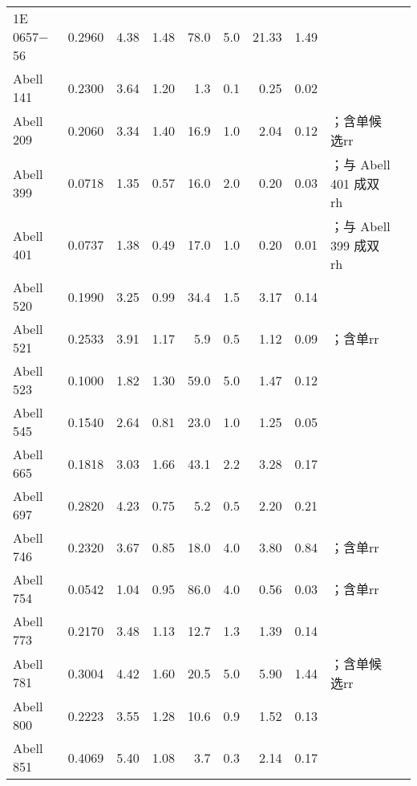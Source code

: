 \begin{ThreePartTable}
\begin{longtable}{lcccr@{$\,\pm\,$}lr@{$\,\pm\,$}lll}
1E 0657$-$56         & 0.2960 & 4.38 & 1.48 &  78.0 &  5.0 & 21.33 &  1.49 & \parencite{liang2000}  \\
Abell 141            & 0.2300 & 3.64 & 1.20 &   1.3 &  0.1\tnote{a} &  0.25 &  0.02 & \parencite{duchesne2017}  \\
Abell 209            & 0.2060 & 3.34 & 1.40 &  16.9 &  1.0 &  2.04 &  0.12 & \parencite{giovannini2009}；含单候选\acl{rr}  \\
Abell 399            & 0.0718 & 1.35 & 0.57 &  16.0 &  2.0 &  0.20 &  0.03 & \parencite{murgia2010}；与 Abell 401 成双\acl{rh}  \\
Abell 401            & 0.0737 & 1.38 & 0.49 &  17.0 &  1.0 &  0.20 &  0.01 & \parencite{bacchi2003}；与 Abell 399 成双\acl{rh}  \\
Abell 520            & 0.1990 & 3.25 & 0.99 &  34.4 &  1.5 &  3.17 &  0.14 & \parencite{govoni2001}  \\
Abell 521            & 0.2533 & 3.91 & 1.17 &   5.9 &  0.5 &  1.12 &  0.09 & \parencite{giovannini2009}；含单\acl{rr}  \\
Abell 523            & 0.1000 & 1.82 & 1.30 &  59.0 &  5.0 &  1.47 &  0.12 & \parencite{giovannini2011}  \\
Abell 545            & 0.1540 & 2.64 & 0.81 &  23.0 &  1.0 &  1.25 &  0.05 & \parencite{bacchi2003}  \\
Abell 665            & 0.1818 & 3.03 & 1.66 &  43.1 &  2.2 &  3.28 &  0.17 & \parencite{giovannini2000}  \\
Abell 697            & 0.2820 & 4.23 & 0.75 &   5.2 &  0.5 &  2.20 &  0.21 & \parencite{vanWeeren2011}  \\
Abell 746            & 0.2320 & 3.67 & 0.85 &  18.0 &  4.0 &  3.80 &  0.84 & \parencite{vanWeeren2011}；含单\acl{rr}  \\
Abell 754            & 0.0542 & 1.04 & 0.95 &  86.0 &  4.0 &  0.56 &  0.03 & \parencite{bacchi2003}；含单\acl{rr}  \\
Abell 773            & 0.2170 & 3.48 & 1.13 &  12.7 &  1.3 &  1.39 &  0.14 & \parencite{govoni2001}  \\
Abell 781            & 0.3004 & 4.42 & 1.60 &  20.5 &  5.0 &  5.90 &  1.44 & \parencite{govoni2011}；含单候选\acl{rr}  \\
Abell 800            & 0.2223 & 3.55 & 1.28 &  10.6 &  0.9 &  1.52 &  0.13 & \parencite{govoni2012}  \\
Abell 851            & 0.4069 & 5.40 & 1.08 &   3.7 &  0.3 &  2.14 &  0.17 & \parencite{giovannini2009}  \\

\end{longtable}
\end{ThreePartTable}
